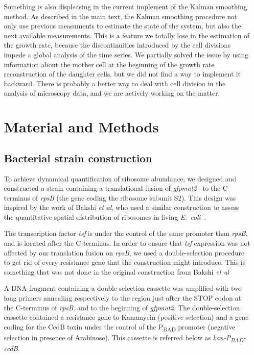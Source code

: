 Something is also displeasing in the current implement of the Kalman smoothing method.
As described in the main text, the Kalman smoothing procedure not only use previous measuments to estimate the state of the system, but also the next available measurements.
This is a feature we totally lose in the estimation of the growth rate, because the discontinuities introduced by the cell divisions impede a global analysis of the time series.
We partially solved the issue by using information about the mother cell at the beginning of the growth rate reconstruction of the daughter cells, but we did not find a way to implement it backward.
There is probably a better way to deal with cell division in the analysis of microscopy data, and we are actively working on the matter.

\section{Material and Methods}

\subsection{Bacterial strain construction}
\label{sec:methods_strain}

To achieve dynamical quantification of ribosome abundance, we designed and constructed a strain containing a translational fusion of \textit{gfpmut2}~\cite{zaslaver_comprehensive_2006} to the C-terminus of \textit{rpsB} (the gene coding the ribosome subunit S2).
This design was inspired by the work of Bakshi \textit{et al}, who used a similar construction to assess the quantitative spatial distribution of ribosomes in living \textit{E.~coli}~\cite{bakshi_superresolution_2012}.

The transcription factor \textit{tsf} is under the control of the same promoter than \textit{rpsB}, and is located after the C-terminus.
In order to ensure that \textit{tsf} expression was not affected by our translation fusion on \textit{rpsB}, we used a double-selection procedure to get rid of every resistance gene that the construction might introduce.
This is something that was not done in the original construction from Bakshi \textit{et al}~\cite{bakshi_superresolution_2012}

A DNA fragment containing a double selection cassette was amplified with two long primers annealing respectively to the region just after the STOP codon at the C-terminus of \textit{rpsB}, and to the beginning of \textit{gfpmut2}.
The double-selection cassette contained a resistance gene to Kanamycin (positive selection) and a gene coding for the CcdB toxin under the control of the P\textsubscript{BAD} promoter (negative selection in presence of Arabinose).
This cassette is referred below as \textit{kan-P\textsubscript{BAD}-ccdB}.

